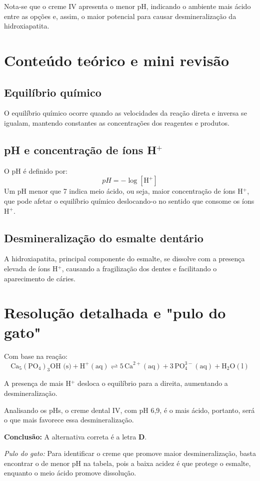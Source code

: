\documentclass{article}
\begin{document}
Nota-se que o creme IV apresenta o menor pH, indicando o ambiente mais ácido entre as opções e, assim, o maior potencial para causar desmineralização da hidroxiapatita.

\section*{Conteúdo teórico e mini revisão}
\subsection*{Equilíbrio químico}
O equilíbrio químico ocorre quando as velocidades da reação direta e inversa se igualam, mantendo constantes as concentrações dos reagentes e produtos.

\subsection*{pH e concentração de íons H$^{+}$}
O pH é definido por:
\[
pH = -\log[\text{H}^{+}]
\]
Um pH menor que 7 indica meio ácido, ou seja, maior concentração de íons H$^{+}$, que pode afetar o equilíbrio químico deslocando-o no sentido que consome os íons H$^{+}$.

\subsection*{Desmineralização do esmalte dentário}
A hidroxiapatita, principal componente do esmalte, se dissolve com a presença elevada de íons H$^{+}$, causando a fragilização dos dentes e facilitando o aparecimento de cáries.

\section*{Resolução detalhada e "pulo do gato"}
Com base na reação:
\[
\text{Ca}_5(\text{PO}_4)_3\text{OH (s)} + \text{H}^+ (\text{aq}) \rightleftharpoons 5\,\text{Ca}^{2+} (\text{aq}) + 3\,\text{PO}_4^{3-} (\text{aq}) + \text{H}_2\text{O} (\text{l})
\]

A presença de mais H$^{+}$ desloca o equilíbrio para a direita, aumentando a desmineralização.

Analisando os pHs, o creme dental IV, com pH 6,9, é o mais ácido, portanto, será o que mais favorece essa desmineralização.

\textbf{Conclusão:} A alternativa correta é a letra \textbf{D}.

\textit{Pulo do gato:} Para identificar o creme que promove maior desmineralização, basta encontrar o de menor pH na tabela, pois a baixa acidez é que protege o esmalte, enquanto o meio ácido promove dissolução.
\end{document}
